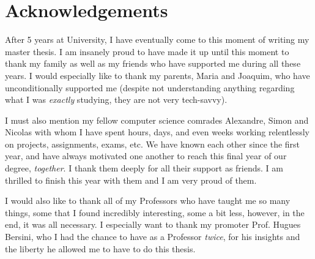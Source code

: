 
\chapter*{Acknowledgements}
After 5 years at University, I have eventually come to this moment of writing my master thesis. I am insanely proud to have made it up until this moment to thank my family as well as my friends who have supported me during all these years. 
I would especially like to thank my parents, Maria and Joaquim, who have unconditionally supported me (despite not understanding anything regarding what I was \emph{exactly} studying, they are not very tech-savvy).

I must also mention my fellow computer science comrades Alexandre, Simon and Nicolas with whom I have spent hours, days, and even weeks working relentlessly on projects, assignments, exams, etc. We have known each other since the first year, and have always motivated one another to reach this final year of our degree, \emph{together}. I thank them deeply for all their support as friends. I am thrilled to finish this year with them and I am very proud of them.

I would also like to thank all of my Professors who have taught me so many things, some that I found incredibly interesting, some a bit less, however, in the end, it was all necessary. I especially want to thank my promoter Prof. Hugues Bersini, who I had the chance to have as a Professor \emph{twice}, for his insights and the liberty he allowed me to have to do this thesis.